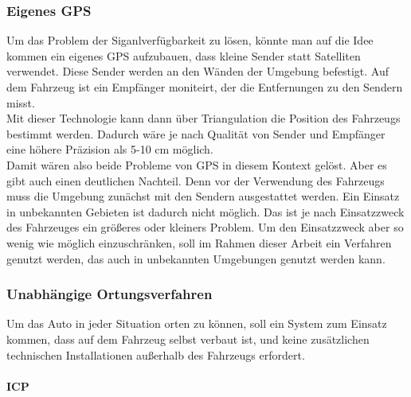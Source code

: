 \subsubsection{Eigenes GPS}
Um das Problem der Siganlverfügbarkeit zu lösen, könnte man auf die Idee kommen ein eigenes GPS aufzubauen, dass kleine Sender statt Satelliten verwendet. 
Diese Sender werden an den Wänden der Umgebung befestigt. Auf dem Fahrzeug ist ein Empfänger moniteirt, der die Entfernungen zu den Sendern misst.\\
Mit dieser Technologie kann dann über Triangulation die Position des Fahrzeugs bestimmt werden. Dadurch wäre je nach Qualität von Sender und Empfänger eine höhere Präzision als 
5-10 cm möglich. \\
Damit wären also beide Probleme von GPS in diesem Kontext gelöst. Aber es gibt auch einen deutlichen Nachteil. Denn vor der Verwendung des Fahrzeugs muss die Umgebung zunächst
mit den Sendern ausgestattet werden. Ein Einsatz in unbekannten Gebieten ist dadurch nicht möglich. Das ist je nach Einsatzzweck des Fahrzeuges ein größeres oder kleiners Problem.
Um den Einsatzzweck aber so wenig wie möglich einzuschränken, soll im Rahmen dieser Arbeit ein Verfahren genutzt werden, das auch in unbekannten Umgebungen genutzt werden kann.
\subsubsection{Unabhängige Ortungsverfahren}
Um das Auto in jeder Situation orten zu können, soll ein System zum Einsatz kommen, dass auf dem Fahrzeug selbst verbaut ist, und keine zusätzlichen technischen Installationen außerhalb des Fahrzeugs erfordert.\\
\paragraph{ICP}

\newpage
